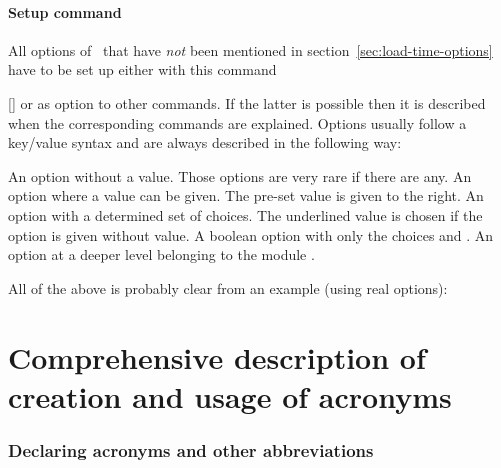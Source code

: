 \documentclass{acro-manual}
\begin{document}
\subsection{Setup command}\label{sec:setup-command}
All options of \acro\ that have \emph{not} been mentioned in
section~\ref{sec:load-time-options} have to be set up either with this command
\begin{commands}
  []
    or as option to other commands.  If the latter is possible then it is
    described when the corresponding commands are explained.  Options usually
    follow a key\slash value syntax and are always described in the following
    way:
\end{commands}
\begin{options}
    An option without a value. Those options are very rare if there are any.
    An option where a value can be given.  The pre-set value is given to the
    right.
    An option with a determined set of choices. The underlined value is
    chosen if the option is given without value.
    A boolean option with only the choices  and .
    An option at a deeper level belonging to the module .
\end{options}
All of the above is probably clear from an example (using real options):
\begin{sourcecode}
\end{sourcecode}

\part{Comprehensive description of creation and usage of acronyms}\label{part:compr-descr-creat}
\section{Declaring acronyms and other abbreviations}\label{sec:decl-acronyms-other}
\end{document}
